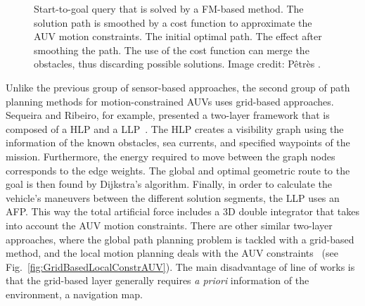 \begin{figure}[htbp]
    \myfloatalign
     \quad
     \quad
\caption[FM-based planning for AUVs under motion constraints.]
{Start-to-goal query that is solved by a FM-based method. The solution path is
smoothed by a cost function to approximate the AUV motion constraints.
\protect {} The initial optimal path.
\protect {} The effect after smoothing the
path.
\protect {} The use of the cost function
can merge the obstacles, thus discarding possible solutions. Image credit:
Pêtrès \etal\cite{Petres2007}.}
\label{fig:CostFunctionConstrainedAUV}
\end{figure}

Unlike the previous group of sensor-based approaches, the second group of path
planning methods for motion-constrained \acp{AUV} uses grid-based approaches.
Sequeira and Ribeiro, for example, presented a two-layer framework that is
composed of a \ac{HLP} and a \ac{LLP}~\cite{Sequeira1994}. The \ac{HLP} creates
a visibility graph using the information of the known obstacles, sea currents,
and specified waypoints of the mission. Furthermore, the energy required to move
between the graph nodes corresponds to the edge weights. The global and optimal
geometric route to the goal is then found by Dijkstra's algorithm. Finally, in
order to calculate the vehicle's maneuvers between the different solution
segments, the \ac{LLP} uses an \ac{AFP}. This way the total artificial force
includes a \ac{3D} double integrator that takes into account the \ac{AUV} motion
constraints. There are other similar two-layer approaches, where the global path
planning problem is tackled with a grid-based method, and the local motion
planning deals with the \ac{AUV} constraints~\cite{Arinaga1996} (see
Fig.~\ref{fig:GridBasedLocalConstrAUV}). The main disadvantage of line of works
is that the grid-based layer generally requires \textit{a priori} information of
the environment, \eg a navigation map.

